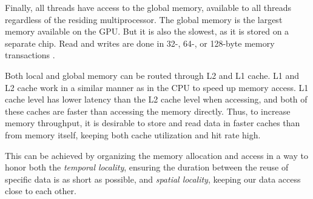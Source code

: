 Finally, all threads have access to the global memory, available to all threads regardless of the residing multiprocessor. The global memory is the largest memory available on the GPU. But it is also the slowest, as it is stored on a separate chip. Read and writes are done in 32-, 64-, or 128-byte memory transactions \cite{cudaprog}.

Both local and global memory can be routed through L2 and L1 cache. L1 and L2 cache work in a similar manner as in the CPU to speed up memory access. L1 cache level has lower latency than the L2 cache level when accessing, and both of these caches are faster than accessing the memory directly. Thus, to increase memory throughput, it is desirable to store and read data in faster caches than from memory itself, keeping both cache utilization and hit rate high.

This can be achieved by organizing the memory allocation and access in a way to honor both the \textit{temporal locality}, ensuring the duration between the reuse of specific data is as short as possible, and \textit{spatial locality}, keeping our data access close to each other.

